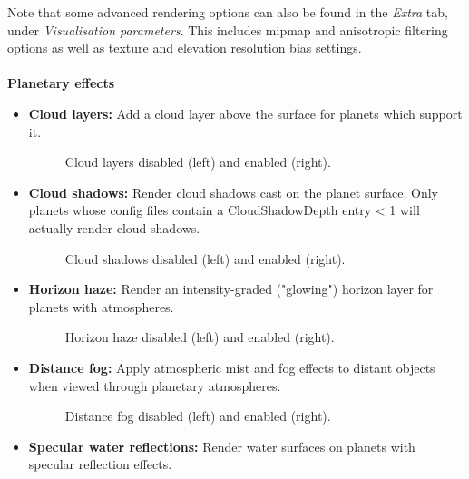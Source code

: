 \documentclass[Orbiter User Manual.tex]{subfiles}
\begin{document}
\noindent
Note that some advanced rendering options can also be found in the \textit{Extra} tab, under \textit{Visualisation parameters}. This includes mip­map and anisotropic filtering options as well as texture and elevation resolution bias settings.\\
\\
\textbf{Planetary effects}

\begin{itemize}
\item \textbf{Cloud layers:} Add a cloud layer above the surface for planets which support it.

\begin{figure}[H]
	\centering
	\caption{Cloud layers disabled (left) and enabled (right).}
\end{figure}

\item \textbf{Cloud shadows:} Render cloud shadows cast on the planet surface. Only planets whose config files contain a CloudShadowDepth entry < 1 will actually render cloud shadows.

\begin{figure}[H]
	\centering
	\caption{Cloud shadows disabled (left) and enabled (right).}
\end{figure}

\item \textbf{Horizon haze:} Render an intensity-graded ("glowing") horizon layer for planets with atmospheres.

\begin{figure}[H]
	\centering
	\caption{Horizon haze disabled (left) and enabled (right).}
\end{figure}

\item \textbf{Distance fog:} Apply atmospheric mist and fog effects to distant objects when viewed through planetary atmospheres.

\begin{figure}[H]
	\centering
	\caption{Distance fog disabled (left) and enabled (right).}
\end{figure}

\item \textbf{Specular water reflections:} Render water surfaces on planets with specular reflection effects.


\end{itemize}
\end{document}
